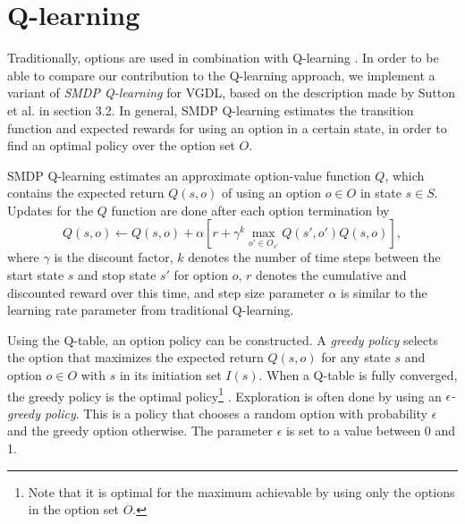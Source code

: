 \chapter{Q-learning}

Traditionally, options are used in combination with Q-learning
\cite{sutton1999between}. In order to be able to compare our contribution to the
Q-learning approach, we implement a variant of \emph{SMDP Q-learning} for VGDL,
based on the description made by Sutton et al. in section 3.2. In general, SMDP
Q-learning estimates the transition function and expected rewards for using an
option in a certain state, in order to find an optimal policy over the option
set $O$.

SMDP Q-learning estimates an approximate option-value function $Q$, which
contains the expected return $Q(s, o)$ of using an option $o \in O$ in state $s
\in S$. Updates for the $Q$ function are done after each option termination by
\begin{equation}
	\label{eq:qlearning}
	Q(s, o) \gets Q(s, o) + \alpha \left[r + \gamma^k \max_{o' \in O_{s'}}Q(s',
	o') Q(s, o)\right],
\end{equation}
where $\gamma$ is the discount factor, $k$ denotes the number of time steps
between the start state $s$ and stop state $s'$ for option $o$, $r$ denotes
the cumulative and discounted reward over this time, and step size parameter
$\alpha$ is similar to the learning rate parameter from traditional Q-learning.

Using the Q-table, an option policy can be constructed. A \emph{greedy policy}
selects the option that maximizes the expected return $Q(s, o)$ for any state
$s$ and option $o \in O$ with $s$ in its initiation set $I(s)$. When a Q-table
is fully converged, the greedy policy is the optimal policy\footnote{Note that
it is optimal for the maximum achievable by using only the options in the option
set $O$.} \cite{sutton1999between}. Exploration is often done by using an
\emph{$\epsilon$-greedy policy}. This is a policy that chooses a random option
with probability $\epsilon$ and the greedy option otherwise. The parameter
$\epsilon$ is set to a value between 0 and 1.

